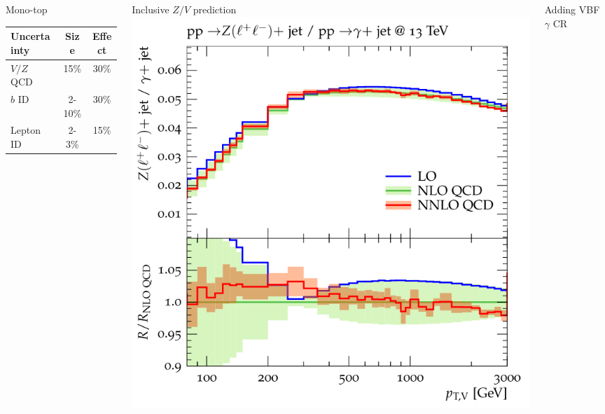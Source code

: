 \documentclass[aspectratio=169,xcolor=dvipsnames,,table,compress]{beamer}
\begin{document}
\begin{frame}
\begin{columns}[T]
\begin{column}{0.33\textwidth}
      \vspace{5mm}
      Mono-top \\
      \begin{tabular}{l|c|c}
        Uncertainty & Size & Effect \\
        \hline \hline
        $V/Z$ QCD & 15\% & 30\%\\
        \hline
        $b$ ID & 2-10\% & 30\% \\
        Lepton ID & 2-3\% & 15\% \\
      \end{tabular}
    \end{column}
    \pause 
    \begin{column}{0.33\textwidth}
      \centering
      Inclusive $Z/V$ prediction \\
      \includegraphics[width=\textwidth]{../figures/talk/mj_theory.png}\\
    \end{column}
    \begin{column}{0.33\textwidth}
      \centering
      Adding VBF $\gamma$ CR \\

\end{column}
\end{columns}
\end{frame}
\end{document}

